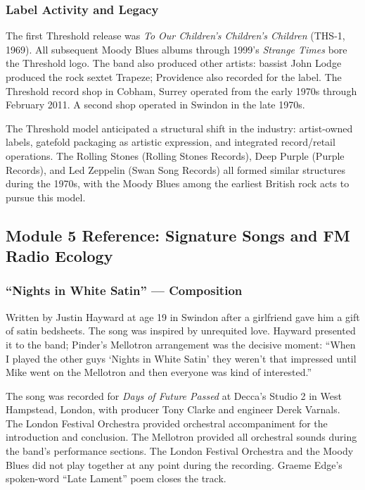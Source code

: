 \documentclass[11pt,letterpaper]{article}
\begin{document}
\subsubsection{Label Activity and Legacy}

The first Threshold release was \textit{To Our Children's Children's Children} (THS-1, 1969). All subsequent Moody Blues albums through 1999's \textit{Strange Times} bore the Threshold logo. The band also produced other artists: bassist John Lodge produced the rock sextet Trapeze; Providence also recorded for the label. The Threshold record shop in Cobham, Surrey operated from the early 1970s through February 2011. A second shop operated in Swindon in the late 1970s.

The Threshold model anticipated a structural shift in the industry: artist-owned labels, gatefold packaging as artistic expression, and integrated record/retail operations. The Rolling Stones (Rolling Stones Records), Deep Purple (Purple Records), and Led Zeppelin (Swan Song Records) all formed similar structures during the 1970s, with the Moody Blues among the earliest British rock acts to pursue this model.

\subsection{Module 5 Reference: Signature Songs and FM Radio Ecology}

\subsubsection{``Nights in White Satin'' --- Composition}

Written by Justin Hayward at age 19 in Swindon after a girlfriend gave him a gift of satin bedsheets. The song was inspired by unrequited love. Hayward presented it to the band; Pinder's Mellotron arrangement was the decisive moment: ``When I played the other guys `Nights in White Satin' they weren't that impressed until Mike went on the Mellotron and then everyone was kind of interested.''

The song was recorded for \textit{Days of Future Passed} at Decca's Studio 2 in West Hampstead, London, with producer Tony Clarke and engineer Derek Varnals. The London Festival Orchestra provided orchestral accompaniment for the introduction and conclusion. The Mellotron provided all orchestral sounds during the band's performance sections. The London Festival Orchestra and the Moody Blues did not play together at any point during the recording. Graeme Edge's spoken-word ``Late Lament'' poem closes the track.
\end{document}

